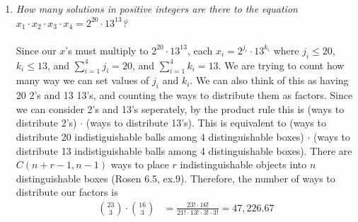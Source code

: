 \documentclass[12pt]{article}
\begin{document}
\begin{enumerate}
\item \emph{How many solutions in positive integers are there to the equation $x_1 \cdot x_2 \cdot x_3 \cdot x_4 = 2^{20} \cdot 13^{13}$?} \\
\\
Since our $x$'s must multiply to $ 2^{20} \cdot 13^{13}$, each $x_i =  2^{j_i} \cdot 13^{k_i}$ where $j_i \leq 20$, $k_i \leq 13$, and $\sum\limits_{i=1}^4 j_i = 20$, and $\sum\limits_{i=1}^4 k_i = 13$. We are trying to count how many way we can set values of $j_i$ and $k_i$. We can also think of this as having 20 2's and 13 13's, and counting the ways to distribute them as factors. Since we can consider 2's and 13's seperately, by the product rule this is (ways to distribute 2's) $\cdot$ (ways to distribute 13's). This is equivalent to (ways to distribute 20 indistiguishable balls among 4 distinguishable boxes) $\cdot$ (ways to distribute 13 indistiguishable balls among 4 distinguishable boxes). There are $C(n+r-1,n-1)$ ways to place $r$ indistinguishable objects into $n$ distinguishable boxes (Rosen 6.5, ex.9). Therefore, the number of ways to distribute our factors is 
\begin{align}
\nonumber \binom{23}{3} \cdot \binom{16}{3} &= \frac{23! \cdot 16!}{21! \cdot 13! \cdot 3! \cdot 3!} = 47,226.67
\end{align}
\\


\end{enumerate}
\end{document}
